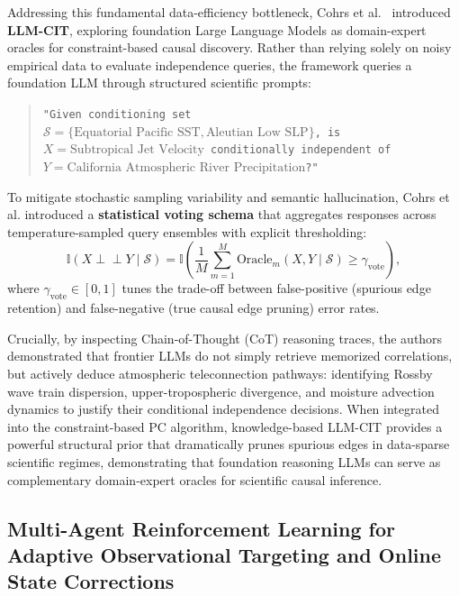 Addressing this fundamental data-efficiency bottleneck, Cohrs et al.~\cite{cohrs2024llmcausal} introduced \textbf{LLM-CIT}, exploring foundation Large Language Models as domain-expert oracles for constraint-based causal discovery. Rather than relying solely on noisy empirical data to evaluate independence queries, the framework queries a foundation LLM through structured scientific prompts:
\begin{quote}
    \small \texttt{"Given conditioning set $\mathcal{S} = \{\text{Equatorial Pacific SST}, \text{Aleutian Low SLP}\}$, is $X = \text{Subtropical Jet Velocity}$ conditionally independent of $Y = \text{California Atmospheric River Precipitation}$?"}
\end{quote}
To mitigate stochastic sampling variability and semantic hallucination, Cohrs et al. introduced a \textbf{statistical voting schema} that aggregates responses across temperature-sampled query ensembles with explicit thresholding:
\begin{equation}
    \mathbb{I}(X \perp\!\!\!\perp Y \mid \mathcal{S}) = \mathbb{I}\left( \frac{1}{M} \sum_{m=1}^M \text{Oracle}_m(X, Y \mid \mathcal{S}) \ge \gamma_{\text{vote}} \right),
    \label{eq:llm_cit_voting}
\end{equation}
where $\gamma_{\text{vote}} \in [0, 1]$ tunes the trade-off between false-positive (spurious edge retention) and false-negative (true causal edge pruning) error rates.

Crucially, by inspecting Chain-of-Thought (CoT) reasoning traces, the authors demonstrated that frontier LLMs do not simply retrieve memorized correlations, but actively deduce atmospheric teleconnection pathways: identifying Rossby wave train dispersion, upper-tropospheric divergence, and moisture advection dynamics to justify their conditional independence decisions. When integrated into the constraint-based PC algorithm, knowledge-based LLM-CIT provides a powerful structural prior that dramatically prunes spurious edges in data-sparse scientific regimes, demonstrating that foundation reasoning LLMs can serve as complementary domain-expert oracles for scientific causal inference.

\subsection{Multi-Agent Reinforcement Learning for Adaptive Observational Targeting and Online State Corrections}
\label{sec:multi_agent_data_assimilation}


